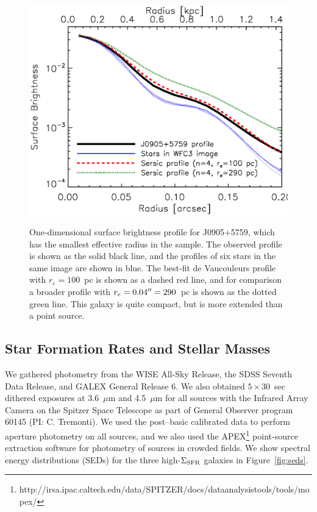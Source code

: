 \documentclass[apj]{emulateapj}
\newcommand{\sigmasfr}{\Sigma_{\textnormal{\scriptsize{SFR}}}}
\begin{document}
\begin{figure}[!t]
\includegraphics[angle=0,scale=0.41]{profile.ps}
\label{fig:profile}
\caption{One-dimensional surface brightness profile for J0905+5759,
  which has the smallest effective radius in the sample.  The observed
  profile is shown as the solid black line, and the profiles of six
  stars in the same image are shown in blue.  The best-fit de
  Vaucouleurs profile with $r_e=100$~pc is shown as a dashed red line,
  and for comparison a broader profile with $r_e=0.04\mbox{$^{\prime\prime}$}=290$~pc
  is shown as the dotted green line.  This galaxy is quite compact,
  but is more extended than a point source.}
\end{figure}

\subsection{Star Formation Rates and Stellar Masses}

We gathered photometry from the WISE All-Sky Release, the SDSS Seventh
Data Release, and GALEX General Release 6.  We also obtained
$5\times30$~sec dithered exposures at 3.6~$\mu$m and 4.5~$\mu$m for
all sources with the Infrared Array Camera on the Spitzer Space
Telescope as part of General Observer program 60145 (PI: C. Tremonti).
We used the post--basic calibrated data to perform aperture photometry
on all sources, and we also used the
APEX\footnote{http://irsa.ipac.caltech.edu/data/SPITZER/docs/dataanalysistools/tools/mopex/}
point-source extraction software for photometry of sources in crowded
fields.  We show spectral energy distributions (SEDs) for the three
high-$\sigmasfr$ galaxies in Figure~\ref{fig:seds}.
\end{document}
